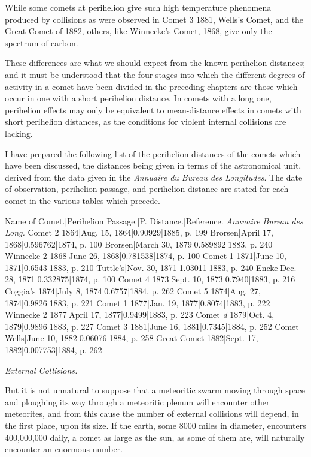 \documentclass[a4paper, 12pt, oneside, polutonikogreek, english]{article}
\begin{document}
While some comets at perihelion give such high temperature phenomena produced by collisions as were observed in Comet 3 1881, Wells's Comet, and the Great Comet of 1882, others, like Winnecke's Comet, 1868, give only the spectrum of carbon.

These differences are what we should expect from the known perihelion distances; and it must be understood that the four stages into which the different degrees of activity in a comet have been divided in the preceding chapters are those which occur in one with a short perihelion distance. In comets with a long one, perihelion effects may only be equivalent to mean-distance effects in comets with short perihelion distances, as the conditions for violent internal collisions are lacking.

I have prepared the following list of the perihelion distances of the comets which have been discussed, the distances being given in terms of the astronomical unit, derived from the data given in the \emph{Annuaire du Bureau des Longitudes}. The date of observation, perihelion passage, and perihelion distance are stated for each comet in the various tables which precede.

Name of Comet.|Perihelion Passage.|P. Distance.|Reference. \emph{Annuaire Bureau des Long.} 
Comet 2 1864|Aug. 15, 1864|0.90929|1885, p. 199 
Brorsen|April 17, 1868|0.596762|1874, p. 100 
Brorsen|March 30, 1879|0.589892|1883, p. 240 
Winnecke 2 1868|June 26, 1868|0.781538|1874, p. 100 
Comet 1 1871|June 10, 1871|0.6543|1883, p. 210 
Tuttle's|Nov. 30, 1871|1.03011|1883, p. 240 
Encke|Dec. 28, 1871|0.332875|1874, p. 100 
Comet 4 1873|Sept. 10, 1873|0.7940|1883, p. 216 
Coggia's 1874|July 8, 1874|0.6757|1884, p. 262 
Comet 5 1874|Aug. 27, 1874|0.9826|1883, p. 221 
Comet 1 1877|Jan. 19, 1877|0.8074|1883, p. 222 
Winnecke 2 1877|April 17, 1877|0.9499|1883, p. 223 
Comet \emph{d} 1879|Oct. 4, 1879|0.9896|1883, p. 227 
Comet 3 1881|June 16, 1881|0.7345|1884, p. 252 
Comet Wells|June 10, 1882|0.06076|1884, p. 258 
Great Comet 1882|Sept. 17, 1882|0.007753|1884, p. 262 

\emph{External Collisions.}

But it is not unnatural to suppose that a meteoritic swarm moving through space and ploughing its way through a meteoritic plenum will encounter other meteorites, and from this cause the number of external collisions will depend, in the first place, upon its size. If the earth, some 8000 miles in diameter, encounters 400,000,000 daily, a comet as large as the sun, as some of them are, will naturally encounter an enormous number.
\end{document}
